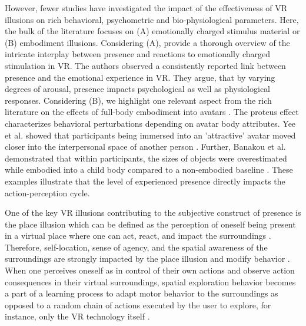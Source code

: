 However, fewer studies have investigated the impact of the effectiveness of VR illusions on rich behavioral, psychometric and bio-physiological parameters. Here, the bulk of the literature focuses on (A) emotionally charged stimulus material or (B) embodiment illusions. Considering (A), \cite{Diemer2015} provide a thorough overview of the intricate interplay between presence and reactions to emotionally charged stimulation in VR. The authors observed a consistently reported link between presence and the emotional experience in VR. They argue, that by varying degrees of arousal, presence impacts psychological as well as physiological responses. Considering (B), we highlight one relevant aspect from the rich literature on the effects of full-body embodiment into avatars \cite{Maister2015}. The proteus effect characterizes behavioral perturbations depending on avatar body attributes. Yee et al. showed that participants being immersed into an 'attractive' avatar moved closer into the interpersonal space of another person \cite{Yee2007}. Further, Banakou et al. demonstrated that within participants, the sizes of objects were overestimated while embodied into a child body compared to a non-embodied baseline \cite{Banakou2013}. These examples illustrate that the level of experienced presence directly impacts the action-perception cycle.

One of the key VR illusions contributing to the subjective construct of presence is the place illusion which can be defined as the perception of oneself being present in a virtual place where one can act, react, and impact the surroundings \cite{Slater2009}. Therefore, self-location, sense of agency, and the spatial awareness of the surroundings are strongly impacted by the place illusion and modify behavior \cite{Kilteni2012}. When one perceives oneself as in control of their own actions and observe action consequences in their virtual surroundings, spatial exploration behavior becomes a part of a learning process to adapt motor behavior to the surroundings as opposed to a random chain of actions executed by the user to explore, for instance, only the VR technology itself \cite{Tan2011}.



